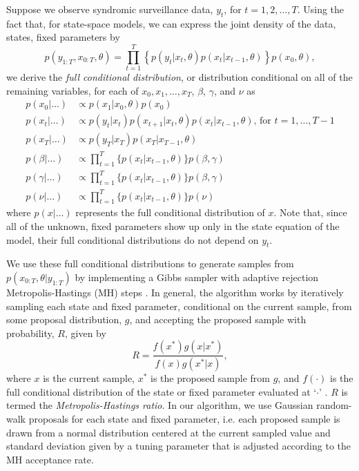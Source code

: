Suppose we observe syndromic surveillance data, $y_t$, for $t = 1, 2, \ldots, T$. Using the fact that, for state-space models, we can express the joint density of the data, states, fixed parameters by
\begin{equation}
p(y_{1:T},x_{0:T},\theta) = \prod_{t = 1}^T \left\{p(y_t|x_t,\theta)p(x_t|x_{t-1},\theta)\right\}p(x_0,\theta), \label{eqn:joint}
\end{equation}
we derive the \emph{full conditional distribution}, or distribution conditional on all of the remaining variables, for each of $x_0, x_1, \ldots, x_T$, $\beta$, $\gamma$, and $\nu$ as
\begin{align}
p(x_0|\hdots) &\propto p(x_1|x_0,\theta)p(x_0) \label{eqn:epid:fullcond} \\
p(x_t|\hdots) &\propto p(y_t|x_t)p(x_{t+1}|x_t,\theta)p(x_t|x_{t-1},\theta) \mbox{, for } t = 1,\ldots,T-1 \nonumber \\
p(x_T|\hdots) &\propto p(y_T|x_T)p(x_T|x_{T-1},\theta) \nonumber \\
p(\beta|\hdots) &\propto \prod_{t=1}^T \{p(x_t|x_{t-1},\theta)\}p(\beta, \gamma) \nonumber \\
p(\gamma|\hdots) &\propto \prod_{t=1}^T \{p(x_t|x_{t-1},\theta)\}p(\beta, \gamma) \nonumber \\
p(\nu|\hdots) &\propto \prod_{t=1}^T \{p(x_t|x_{t-1},\theta)\}p(\nu) \nonumber
\end{align}
where $p(x|\hdots)$ represents the full conditional distribution of $x$. Note that, since all of the unknown, fixed parameters show up only in the state equation of the model, their full conditional distributions do not depend on $y_t$.

We use these full conditional distributions to generate samples from $p(x_{0:T},\theta|y_{1:T})$ by implementing a Gibbs sampler with adaptive rejection Metropolis-Hastings (MH) steps \citep{Metr:Rose:Rose:Tell:Tell:equa:1953, Hast:mont:1970,  Gema:Gema:stoc:1984, gilks1995adaptive}. In general, the algorithm works by iteratively sampling each state and fixed parameter, conditional on the current sample, from some proposal distribution, $g$, and accepting the proposed sample with probability, $R$, given by
\begin{equation}
R = \frac{f(x^*)g(x|x^*)}{f(x)g(x^*|x)}, \label{eqn:mhrat}
\end{equation}
where $x$ is the current sample, $x^*$ is the proposed sample from $g$, and $f(\cdot)$ is the full conditional distribution of the state or fixed parameter evaluated at `$\cdot$' \cite[Chap 7][]{giv:hoet:2005:comp}. $R$ is termed the \emph{Metropolis-Hastings ratio}. In our algorithm, we use Gaussian random-walk proposals for each state and fixed parameter, i.e. each proposed sample is drawn from a normal distribution centered at the current sampled value and standard deviation given by a tuning parameter that is adjusted according to the MH acceptance rate.

